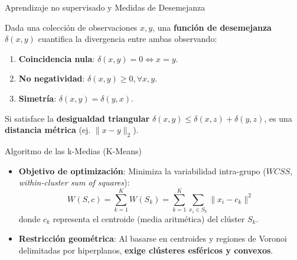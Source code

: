 \documentclass[
  ignorenonframetext,
]{beamer}
\providecommand{\tightlist}{%
  \setlength{\itemsep}{0pt}\setlength{\parskip}{0pt}}
\begin{document}
\begin{frame}{Aprendizaje no supervisado y Medidas de Desemejanza}
\label{aprendizaje-no-supervisado-y-medidas-de-desemejanza}
\begin{tcolorbox}[enhanced jigsaw, left=2mm, opacityback=0, titlerule=0mm, breakable, toptitle=1mm, rightrule=.15mm, bottomtitle=1mm, coltitle=black, title=\textcolor{quarto-callout-note-color}{\faInfo}\hspace{0.5em}{Definición: Medida de desemejanza y distancia métrica}, colframe=quarto-callout-note-color-frame, colbacktitle=quarto-callout-note-color!10!white, arc=.35mm, toprule=.15mm, leftrule=.75mm, bottomrule=.15mm, opacitybacktitle=0.6, colback=white]

Dada una colección de observaciones \(x, y\), una \textbf{función de
desemejanza} \(\delta(x, y)\) cuantifica la divergencia entre ambas
observando:

\begin{enumerate}
\tightlist
\item
  \textbf{Coincidencia nula}: \(\delta(x, y) = 0 \iff x = y\).
\item
  \textbf{No negatividad}: \(\delta(x, y) \ge 0, \forall x, y\).
\item
  \textbf{Simetría}: \(\delta(x, y) = \delta(y, x)\).
\end{enumerate}

Si satisface la \textbf{desigualdad triangular}
\(\delta(x, y) \le \delta(x, z) + \delta(y, z)\), es una
\textbf{distancia métrica} (ej. \(\|x - y\|_2\)).

\end{tcolorbox}
\end{frame}

\begin{frame}{Algoritmo de las k-Medias (K-Means)}
\label{algoritmo-de-las-k-medias-k-means}
\begin{tcolorbox}[enhanced jigsaw, left=2mm, opacityback=0, titlerule=0mm, breakable, toptitle=1mm, rightrule=.15mm, bottomtitle=1mm, coltitle=black, title=\textcolor{quarto-callout-note-color}{\faInfo}\hspace{0.5em}{k-Medias (K-Means)}, colframe=quarto-callout-note-color-frame, colbacktitle=quarto-callout-note-color!10!white, arc=.35mm, toprule=.15mm, leftrule=.75mm, bottomrule=.15mm, opacitybacktitle=0.6, colback=white]

\begin{itemize}
\item
  \textbf{Objetivo de optimización}: Minimiza la variabilidad
  intra-grupo (\(WCSS\), \emph{within-cluster sum of squares}): \[
  W(S, c) = \sum_{k=1}^K W(S_k) = \sum_{k=1}^K \sum_{x_i \in S_k} \|x_i - c_k\|^2
  \] donde \(c_k\) representa el centroide (media aritmética) del
  clúster \(S_k\).
\item
  \textbf{Restricción geométrica}: Al basarse en centroides y regiones
  de Voronoi delimitadas por hiperplanos, \textbf{exige clústeres
  esféricos y convexos}.
\end{itemize}

\end{tcolorbox}
\end{frame}
\end{document}
